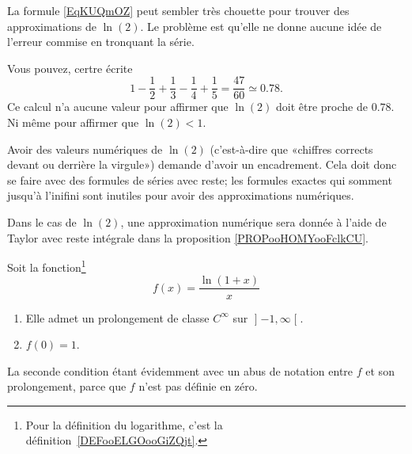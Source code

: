\begin{normaltext}
    La formule \eqref{EqKUQmOZ} peut sembler très chouette pour trouver des approximations de \( \ln(2)\). Le problème est qu'elle ne donne aucune idée de l'erreur commise en tronquant la série.

    Vous pouvez, certre écrite
    \begin{equation}
        1-\frac{ 1 }{2}+\frac{1}{ 3 }-\frac{1}{ 4 }+\frac{1}{ 5 }=\frac{ 47 }{ 60 }\simeq 0.78.
    \end{equation}
    Ce calcul n'a aucune valeur pour affirmer que \( \ln(2)\) doit être proche de \( 0.78\). Ni même pour affirmer que \( \ln(2)<1\).

    Avoir des valeurs numériques de \( \ln(2)\) (c'est-à-dire que «chiffres corrects devant ou derrière la virgule») demande d'avoir un encadrement. Cela doit donc se faire avec des formules de séries avec reste; les formules exactes qui somment jusqu'à l'inifini sont inutiles pour avoir des approximations numériques.

    Dans le cas de \( \ln(2)\), une approximation numérique sera donnée à l'aide de Taylor avec reste intégrale dans la proposition \ref{PROPooHOMYooFclkCU}.
\end{normaltext}

\begin{lemma}
    Soit la fonction\footnote{Pour la définition du logarithme, c'est la définition~\ref{DEFooELGOooGiZQjt}.}
    \begin{equation}
        f(x)=\frac{ \ln(1+x) }{ x }
    \end{equation}
    \begin{enumerate}
        \item
        Elle admet un prolongement de classe \(  C^{\infty}\) sur \( \mathopen] -1 , \infty \mathclose[\).
        \item
            \( f(0)=1\).
    \end{enumerate}
    La seconde condition étant évidemment avec un abus de notation entre \( f\) et son prolongement, parce que \( f\) n'est pas définie en zéro.
\end{lemma}

